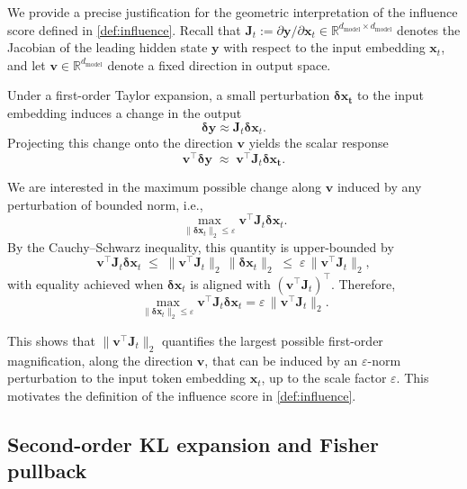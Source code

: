 \documentclass{article}
\begin{document}
We provide a precise justification for the geometric interpretation of the influence score defined in \cref{def:influence}.
Recall that $\bm{J}_t := \partial \bm{y} / \partial \bm{x}_t \in \mathbb{R}^{d_{\text{model}} \times d_{\text{model}}}$ denotes the Jacobian of the leading hidden state $\bm{y}$ with respect to the input embedding $\bm{x}_t$, and let $\bm{v} \in \mathbb{R}^{d_{\text{model}}}$ denote a fixed direction in output space.

Under a first-order Taylor expansion, a small perturbation $\bm{\delta x_t}$ to the input embedding induces a change in the output
\[
 \bm{\delta y} \approx\bm{J}_t \bm{\delta x}_t.
\]
Projecting this change onto the direction $\bm{v}$ yields the scalar response
\[
\bm{v}^\intercal \bm{\delta y}
\;\approx\;
\bm{v}^\intercal \bm{J}_t\bm{\delta x_t}.
\]

We are interested in the maximum possible change along $\bm{v}$ induced by any perturbation of bounded norm, i.e.,
\[
\max_{\|\bm{\delta x}_t\|_2 \le \varepsilon}
\bm{v}^\intercal \bm{J}_t \bm{\delta x}_t.
\]
By the Cauchy--Schwarz inequality, this quantity is upper-bounded by
\[
\bm{v}^\intercal \bm{J}_t \bm{\delta x}_t
\;\le\;
\|\bm{v}^\intercal \bm{J}_t\|_2 \, \|\bm{\delta x}_t\|_2
\;\le\;
\varepsilon \, \|\bm{v}^\intercal \bm{J}_t\|_2,
\]
with equality achieved when $\bm{\delta x}_t$ is aligned with $(\bm{v}^\intercal \bm{J}_t)^\intercal$.
Therefore,
\[
\max_{\|\bm{\delta x}_t\|_2 \le \varepsilon}
\bm{v}^\intercal \bm{J}_t \bm{\delta x}_t
=
\varepsilon \, \|\bm{v}^\intercal \bm{J}_t\|_2.
\]

This shows that $\|\bm{v}^\intercal \bm{J}_t\|_2$ quantifies the largest possible first-order magnification, along the direction $\bm{v}$, that can be induced by an $\varepsilon$-norm perturbation to the input token embedding $\bm{x}_t$, up to the scale factor $\varepsilon$.
This motivates the definition of the influence score in \cref{def:influence}.



\subsection{Second-order KL expansion and Fisher pullback}
\label{app:kl_second_order}
\end{document}
